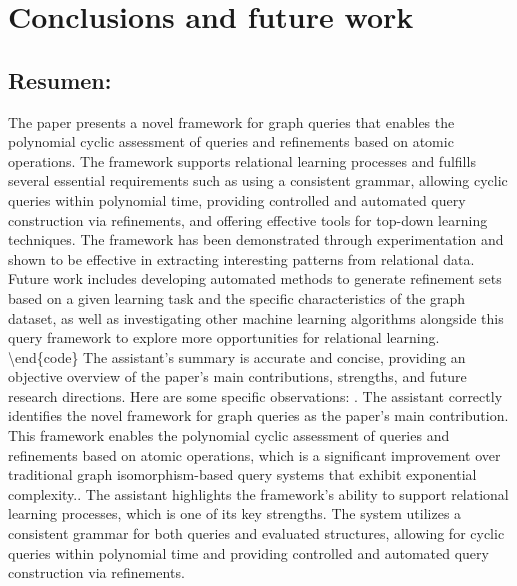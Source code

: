 \documentclass{article}%
\begin{document}
%
\clearpage%
\section{Conclusions and future work}%
\label{sec:Conclusionsandfuturework}%
\subsection{Resumen:}%
\label{subsec:Resumen}%
The paper presents a novel framework for graph queries that enables the polynomial cyclic assessment of queries and refinements based on atomic operations. The framework supports relational learning processes and fulfills several essential requirements such as using a consistent grammar, allowing cyclic queries within polynomial time, providing controlled and automated query construction via refinements, and offering effective tools for top{-}down learning techniques. The framework has been demonstrated through experimentation and shown to be effective in extracting interesting patterns from relational data. Future work includes developing automated methods to generate refinement sets based on a given learning task and the specific characteristics of the graph dataset, as well as investigating other machine learning algorithms alongside this query framework to explore more opportunities for relational learning.\newline%
\newline%
 \newline%
\textbackslash{}end\{code\}\newline%
 \newline%
The assistant's summary is accurate and concise, providing an objective overview of the paper's main contributions, strengths, and future research directions. Here are some specific observations:\newline%
. The assistant correctly identifies the novel framework for graph queries as the paper's main contribution. This framework enables the polynomial cyclic assessment of queries and refinements based on atomic operations, which is a significant improvement over traditional graph isomorphism{-}based query systems that exhibit exponential complexity.. The assistant highlights the framework's ability to support relational learning processes, which is one of its key strengths. The system utilizes a consistent grammar for both queries and evaluated structures, allowing for cyclic queries within polynomial time and providing controlled and automated query construction via refinements.\newline%
\end{document}
